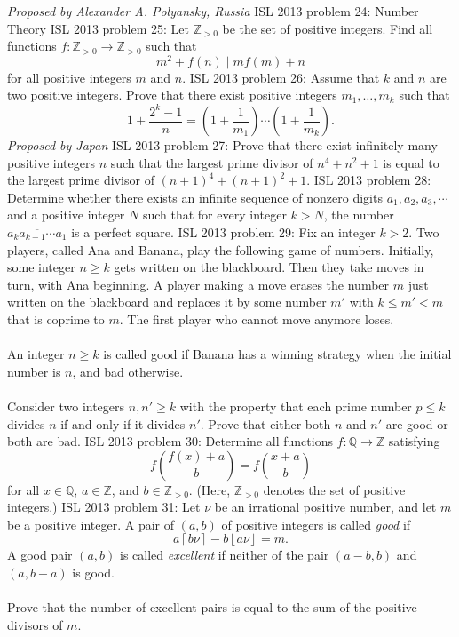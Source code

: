 \textit{Proposed by Alexander A. Polyansky, Russia} 
ISL 2013 problem 24:  Number Theory 
ISL 2013 problem 25:  Let $\mathbb{Z} _{>0}$ be the set of positive integers. Find all functions  $f: \mathbb{Z} _{>0}\rightarrow \mathbb{Z} _{>0}$ such that
\[ m^2 + f(n) \mid mf(m) +n \]
for all positive integers $m$ and $n$. 
ISL 2013 problem 26:  Assume that $k$ and $n$ are two positive integers. Prove that there exist positive integers $m_1 , \dots , m_k$ such that
\[ 1+\frac{2^k-1}{n}=\left(1+\frac1{m_1}\right)\cdots \left(1+\frac1{m_k}\right). \]
\textit{Proposed by Japan} 
ISL 2013 problem 27:  Prove that there exist infinitely many positive integers $n$ such that the largest prime divisor of $n^4 + n^2 + 1$ is equal to the largest prime divisor of $(n+1)^4 + (n+1)^2 +1$. 
ISL 2013 problem 28:  Determine whether there exists an infinite sequence of nonzero digits $a_1 , a_2 , a_3 , \cdots $ and a positive integer $N$ such that for every integer $k > N$, the number $\overline{a_k a_{k-1}\cdots a_1 }$ is a perfect square. 
ISL 2013 problem 29:  Fix an integer $k>2$. Two players, called Ana and Banana, play the following game of numbers. Initially, some integer $n \ge k$ gets written on the blackboard. Then they take moves in turn, with Ana beginning. A player making a move erases the number $m$ just written on the blackboard and replaces it by some number $m'$ with $k \le m' < m$ that is coprime to $m$. The first player who cannot move anymore loses. \\\\
An integer $n \ge k $ is called good if Banana has a winning strategy when the initial number is $n$, and bad otherwise. \\\\
Consider two integers $n,n' \ge k$ with the property that each prime number $p \le k$ divides $n$ if and only if it divides $n'$. Prove that either both $n$ and $n'$ are good or both are bad. 
ISL 2013 problem 30:  Determine all functions $f: \mathbb{Q} \rightarrow \mathbb{Z} $ satisfying
\[ f \left( \frac{f(x)+a} {b}\right) = f \left( \frac{x+a}{b} \right) \]
for all  $x \in \mathbb{Q}$, $a \in \mathbb{Z}$, and $b \in \mathbb{Z}_{>0}$. (Here, $\mathbb{Z}_{>0}$ denotes the set of positive integers.) 
ISL 2013 problem 31:  Let $\nu$ be an irrational positive number, and let $m$ be a positive integer. A pair of $(a,b)$ of positive integers is called \textit{good} if
\[ a \left \lceil b\nu \right \rceil - b \left \lfloor a \nu \right \rfloor = m. \]
A good pair $(a,b)$ is called \textit{excellent} if neither of the pair $(a-b,b)$ and $(a,b-a)$ is good. \\\\
Prove that the number of excellent pairs is equal to the sum of the positive divisors of $m$. 

